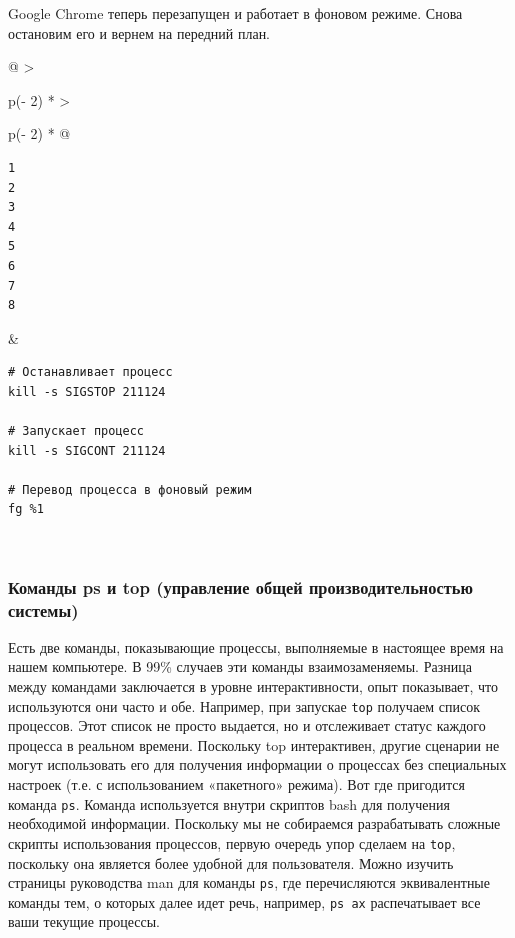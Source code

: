 \documentclass{article}
\begin{document}
Google Chrome теперь перезапущен и работает в фоновом режиме. Снова
остановим его и вернем на передний план.

\begin{longtable}[]{@{}
  >{\raggedright\arraybackslash}p{(\columnwidth - 2\tabcolsep) * }
  >{\raggedright\arraybackslash}p{(\columnwidth - 2\tabcolsep) * }@{}}
\toprule
\endhead
\begin{minipage}[t]{\linewidth}\raggedright
\begin{verbatim}
1
2
3
4
5
6
7
8
\end{verbatim}
\end{minipage} & \begin{minipage}[t]{\linewidth}\raggedright
\begin{verbatim}
# Останавливает процесс
kill -s SIGSTOP 211124

# Запускает процесс
kill -s SIGCONT 211124

# Перевод процесса в фоновый режим
fg %1
\end{verbatim}
\end{minipage} \\ \addlinespace
\bottomrule
\end{longtable}

\hypertarget{ps-and-top-commands-system-performance-management}{%
\subsubsection{\texorpdfstring{\protect\hyperlink{ps-and-top-commands-system-performance-management}{}Команды
ps и top (управление общей производительностью
системы)}{Команды ps и top (управление общей производительностью системы)}}\label{ps-and-top-commands-system-performance-management}}

Есть две команды, показывающие процессы, выполняемые в настоящее время
на нашем компьютере. В 99\% случаев эти команды взаимозаменяемы. Разница
между командами заключается в уровне интерактивности, опыт показывает,
что используются они часто и обе. Например, при запускае \texttt{top}
получаем список процессов. Этот список не просто выдается, но и
отслеживает статус каждого процесса в реальном времени. Поскольку top
интерактивен, другие сценарии не могут использовать его для получения
информации о процессах без специальных настроек (т.е. с использованием
«пакетного» режима). Вот где пригодится команда \texttt{ps}. Команда
используется внутри скриптов bash для получения необходимой информации.
Поскольку мы не собираемся разрабатывать сложные скрипты использования
процессов, первую очередь упор сделаем на \texttt{top}, поскольку она
является более удобной для пользователя. Можно изучить страницы
руководства man для команды \texttt{ps}, где перечисляются эквивалентные
команды тем, о которых далее идет речь, например, \texttt{ps\ ax}
распечатывает все ваши текущие процессы.
\end{document}
